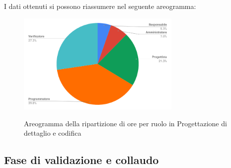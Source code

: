 \pagebreak
I dati ottenuti si possono riassumere nel seguente areogramma:
\begin{figure}[H] 
			\centering 
				\includegraphics[width=0.7\textwidth]{res/images/areogramma_dettaglio.png}\\
				\caption{Areogramma della ripartizione di ore per ruolo in Progettazione di dettaglio e codifica}
			\label{AreogrammaDettaglio}
\end{figure}


\subsection{Fase di validazione e collaudo}
